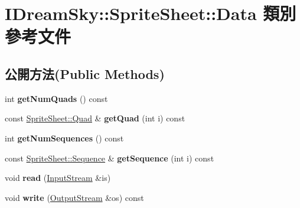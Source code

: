 \hypertarget{class_i_dream_sky_1_1_sprite_sheet_1_1_data}{}\section{I\+Dream\+Sky\+:\+:Sprite\+Sheet\+:\+:Data 類別 參考文件}
\label{class_i_dream_sky_1_1_sprite_sheet_1_1_data}
\subsection*{公開方法(Public Methods)}
\begin{DoxyCompactItemize}
\item 
int {\bfseries get\+Num\+Quads} () const \hypertarget{class_i_dream_sky_1_1_sprite_sheet_1_1_data_adc36e46ec543e6a75fd56ef81d20806a}{}\label{class_i_dream_sky_1_1_sprite_sheet_1_1_data_adc36e46ec543e6a75fd56ef81d20806a}

\item 
const \hyperlink{class_i_dream_sky_1_1_sprite_sheet_1_1_quad}{Sprite\+Sheet\+::\+Quad} \& {\bfseries get\+Quad} (int i) const \hypertarget{class_i_dream_sky_1_1_sprite_sheet_1_1_data_a9abe07aa8f124568e4566800d365aad8}{}\label{class_i_dream_sky_1_1_sprite_sheet_1_1_data_a9abe07aa8f124568e4566800d365aad8}

\item 
int {\bfseries get\+Num\+Sequences} () const \hypertarget{class_i_dream_sky_1_1_sprite_sheet_1_1_data_ae72c4deae67aaee1ab8810628ed99afe}{}\label{class_i_dream_sky_1_1_sprite_sheet_1_1_data_ae72c4deae67aaee1ab8810628ed99afe}

\item 
const \hyperlink{class_i_dream_sky_1_1_sprite_sheet_1_1_sequence}{Sprite\+Sheet\+::\+Sequence} \& {\bfseries get\+Sequence} (int i) const \hypertarget{class_i_dream_sky_1_1_sprite_sheet_1_1_data_ae80bd0e727dbf0a51f9b0ac8d10e8390}{}\label{class_i_dream_sky_1_1_sprite_sheet_1_1_data_ae80bd0e727dbf0a51f9b0ac8d10e8390}

\item 
void {\bfseries read} (\hyperlink{class_i_dream_sky_1_1_input_stream}{Input\+Stream} \&is)\hypertarget{class_i_dream_sky_1_1_sprite_sheet_1_1_data_a7dde990f68f3631ff861718158621d1e}{}\label{class_i_dream_sky_1_1_sprite_sheet_1_1_data_a7dde990f68f3631ff861718158621d1e}

\item 
void {\bfseries write} (\hyperlink{class_i_dream_sky_1_1_output_stream}{Output\+Stream} \&os) const \hypertarget{class_i_dream_sky_1_1_sprite_sheet_1_1_data_ae444dcbf6ec05b229e0ff6d3524d8859}{}\label{class_i_dream_sky_1_1_sprite_sheet_1_1_data_ae444dcbf6ec05b229e0ff6d3524d8859}

\end{DoxyCompactItemize}
